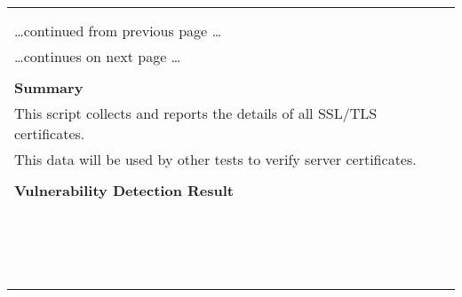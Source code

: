 \documentclass{article}
\begin{document}
\begin{longtable}{|p{}|}
\hline
\rowcolor{gvm_log}{\color{white}{Log (CVSS: 0.0) }}\\
\rowcolor{gvm_log}{\color{white}{NVT: SSL/TLS: Collect and Report Certificate Details}}\\
\hline
\endfirsthead
\hfill\ldots continued from previous page \ldots \\
\hline
\endhead
\hline
\ldots continues on next page \ldots \\
\endfoot
\hline
\endlastfoot
\\
\textbf{Summary}\\
This script collects and reports the details of all SSL/TLS
  certificates.\\
  This data will be used by other tests to verify server certificates.\\

        \hline
        \\
\textbf{Vulnerability Detection Result}\\
\rowcolor{white}{\verb=The following certificate details of the remote service were collected.=}\\
\rowcolor{white}{\verb=Certificate details:=}\\
\rowcolor{white}{\verb=fingerprint (SHA-1)             | 69429852EE28F42AC047C8CF69BC994B46C15D0F=}\\
\rowcolor{white}{\verb=fingerprint (SHA-256)           | 03C38A23289F58F7BDB0626EEF393A1CC50E5C14986692=}\\
\rowcolor{white}{$\hookrightarrow$\verb=2AE072521C4F5B7A0E=}\\
\rowcolor{white}{\verb=issued by                       | L=\verb-=-\verb=Unknown,ST=\verb-=-\verb=Unknown,OU=\verb-=-\verb=Unknown,O=\verb-=-\verb=homeprinter,=}\\
\rowcolor{white}{$\hookrightarrow$\verb=CN=\verb-=-\verb=homeprinter,C=\verb-=-\verb=DE=}\\
\rowcolor{white}{\verb=public key algorithm            | RSA=}\\
\rowcolor{white}{\verb=public key size (bits)          | 2048=}\\
\rowcolor{white}{\verb=serial                          | 61DDAF12=}\\
\rowcolor{white}{\verb=signature algorithm             | sha256WithRSAEncryption=}\\
\rowcolor{white}{\verb=subject                         | L=\verb-=-\verb=Unknown,ST=\verb-=-\verb=Unknown,OU=\verb-=-\verb=Unknown,O=\verb-=-\verb=homeprinter,=}\\
\rowcolor{white}{$\hookrightarrow$\verb=CN=\verb-=-\verb=homeprinter,C=\verb-=-\verb=DE=}\\
\rowcolor{white}{\verb=subject alternative names (SAN) | homeprinter, homeprinter.local, localhost=}\\
\rowcolor{white}{\verb=valid from                      | 2022-01-11 16:23:46 UTC=}\\
\rowcolor{white}{\verb=valid until                     | 2032-01-09 16:23:46 UTC=}\\


\end{longtable}
\end{document}
